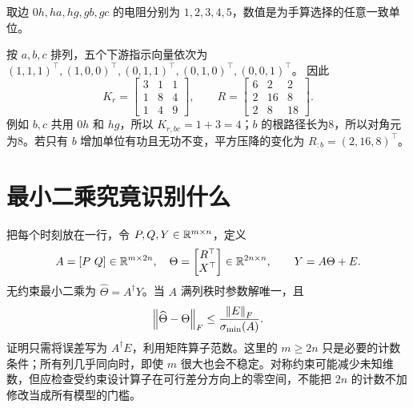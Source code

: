 \begin{example}[贯穿全书的三叶树]\label{ex:tb-tree}
取边 $0h,ha,hg,gb,gc$ 的电阻分别为 $1,2,3,4,5$，数值是为手算选择的任意一致单位。
\begin{center}
\end{center}
按 $a,b,c$ 排列，五个下游指示向量依次为
$(1,1,1)^\top,(1,0,0)^\top,(0,1,1)^\top,(0,1,0)^\top,(0,0,1)^\top$。
因此
\begin{equation}
 K_r=\begin{bmatrix}3&1&1\\1&8&4\\1&4&9\end{bmatrix},\qquad
 R=\begin{bmatrix}6&2&2\\2&16&8\\2&8&18\end{bmatrix}.
 \label{eq:tb-toy-k}
\end{equation}
例如 $b,c$ 共用 $0h$ 和 $hg$，所以 $K_{r,bc}=1+3=4$；$b$ 的根路径长为8，所以对角元为8。若只有 $b$ 增加单位有功且无功不变，平方压降的变化为 $R_{:b}=(2,16,8)^\top$。
\end{example}

\section{最小二乘究竟识别什么}
把每个时刻放在一行，令 $P,Q,Y\in\mathbb{R}^{m\times n}$，定义
\begin{equation}
 A=[P\ Q]\in\R^{m\times2n},\quad
 \Theta=\begin{bmatrix}R^\top\\X^\top\end{bmatrix}\in\R^{2n\times n},
 \qquad Y=A\Theta+E.
\end{equation}
无约束最小二乘为 $\widehat\Theta=A^\dagger Y$。当 $A$ 满列秩时参数解唯一，且
\begin{equation}
 \left\lVert\widehat\Theta-\Theta\right\rVert_F
 \leq\frac{\left\lVert E\right\rVert_F}{\sigma_{\min}(A)}.
 \label{eq:tb-ls-bound}
\end{equation}
证明只需将误差写为 $A^\dagger E$，利用矩阵算子范数。这里的 $m\geq2n$ 只是必要的计数条件；所有列几乎同向时，即使 $m$ 很大也会不稳定。对称约束可能减少未知维数，但应检查受约束设计算子在可行差分方向上的零空间，不能把 $2n$ 的计数不加修改当成所有模型的门槛。

